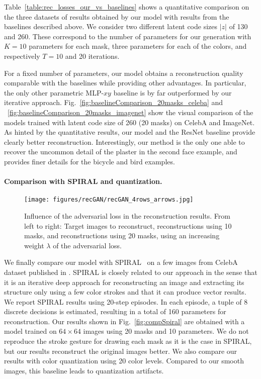 \documentclass[10pt,twocolumn,letterpaper]{article}
\begin{document}
Table~\ref{table:rec_losses_our_vs_baselines} shows a quantitative comparison on the three datasets of results obtained by our model with results from the baselines described above. We consider two different latent code sizes $|z|$ of 130 and 260. These correspond to the number of parameters for our generation with $K=10$ parameters for each mask, three parameters for each of the colors, and respectively $T=10$ and 20 iterations.  


For a fixed number of parameters, our model obtains a reconstruction quality comparable with the baselines while providing other advantages. In particular, the only other parametric MLP-$xy$ baseline is by far outperformed by our iterative approach. 
Fig.~\ref{fig:baselineComparison_20masks_celeba} and ~\ref{fig:baselineComparison_20masks_imagenet} show the visual comparison of the models trained with latent code size of 260 (20 masks) on CelebA and ImageNet. As hinted by the quantitative results, our model and the ResNet baseline provide clearly better reconstruction. Interestingly, our method is the only one able to recover the uncommon detail of the plaster in the second face example, and provides finer details for the bicycle and bird examples. 


\paragraph{Comparison with SPIRAL and quantization.}

\begin{figure*}[htb]
\begin{center}
\texttt{[image: figures/recGAN/recGAN\_4rows\_arrows.jpg]}
\end{center}
\vspace{-4mm}
   \caption{Influence of the adversarial loss in the reconstruction results. From left to right: Target images to reconstruct, reconstructions using 10 masks, and reconstructions using 20 masks, using an increasing weight $\lambda$ of the adversarial loss.}
\label{fig:advRec_IN_celeba}
\end{figure*}

We finally compare our model with SPIRAL~\cite{ganin2018synthesizing} on a few images from CelebA dataset published in \cite{ganin2018synthesizing}. SPIRAL is closely related to our approach in the sense that it is an iterative deep approach for reconstructing an image and extracting its structure only using a few color strokes and that it can produce vector results. We report SPIRAL results using 20-step episodes. In each episode, a tuple of 8 discrete decisions is estimated, resulting in a total of 160 parameters for reconstruction. Our results shown in Fig.~\ref{fig:compSpiral} are obtained with a model trained on $64\times64$ images using 20 masks and 10 parameters. We do not reproduce the stroke gesture for drawing each mask as it is the case in SPIRAL, but our results reconstruct the original images better. We also compare our results with color quantization \cite{pngquant} using 20 color levels. Compared to our smooth images, this baseline leads to quantization artifacts. 
\end{document}
